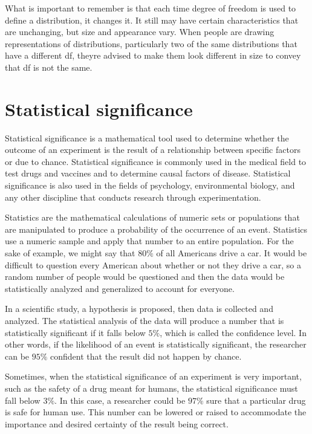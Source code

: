 What is important to remember is that each time degree of freedom is used to define a distribution, it changes it. It still may have certain characteristics that are unchanging, but size and appearance vary. When people are drawing representations of distributions, particularly two of the same distributions that have a different df, theyre advised to make them look different in size to convey that df is not the same.



\section{Statistical significance}

Statistical significance is a mathematical tool used to determine whether the outcome of an experiment is the result of a relationship between specific factors or due to chance. Statistical significance is commonly used in the medical field to test drugs and vaccines and to determine causal factors of disease. Statistical significance is also used in the fields of psychology, environmental biology, and any other discipline that conducts research through experimentation.

Statistics are the mathematical calculations of numeric sets or populations that are manipulated to produce a probability of the occurrence of an event. Statistics use a numeric sample and apply that number to an entire population. For the sake of example, we might say that $80\%$ of all Americans drive a car. It would be difficult to question every American about whether or not they drive a car, so a random number of people would be questioned and then the data would be statistically analyzed and generalized to account for everyone.

In a scientific study, a hypothesis is proposed, then data is collected and analyzed. The statistical analysis of the data will produce a number that is statistically significant if it falls below $5\%$, which is called the confidence level. In other words, if the likelihood of an event is statistically significant, the researcher can be $95\%$ confident that the result did not happen by chance.

Sometimes, when the statistical significance of an experiment is very important, such as the safety of a drug meant for humans, the statistical significance must fall below $3\%$. In this case, a researcher could be $97\%$ sure that a particular drug is safe for human use. This number can be lowered or raised to accommodate the importance and desired certainty of the result being correct.

